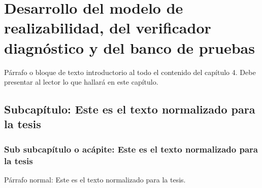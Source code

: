 \chapter{Desarrollo del modelo de realizabilidad, del verificador diagnóstico y del banco de pruebas}
\label{cap:desarrollo-modelo}

Párrafo o bloque de texto introductorio al todo el contenido del capítulo 4. Debe presentar al lector lo que hallará en este capítulo.

\section{Subcapítulo: Este es el texto normalizado para la tesis}

\subsection{Sub subcapítulo o acápite: Este es el texto normalizado para la tesis}

Párrafo normal: Este es el texto normalizado para la tesis.
